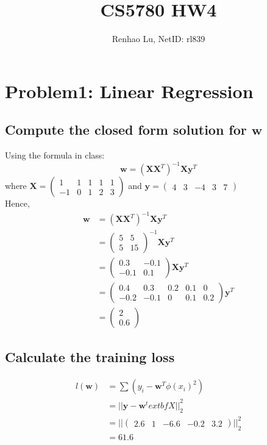 \documentclass{article}
\title{CS5780 HW4}
\author{Renhao Lu, NetID: rl839}
\begin{document}
	\maketitle
	
	\section{Problem1: Linear Regression}
	\subsection{Compute the closed form solution for $\textbf{w}$}
	Using the formula in class:
	\[
	\textbf{w} = 
		(\textbf{X} \textbf{X}^T) ^{-1}
		\textbf{X}
			\textbf{y}^T
	\]
	where $\textbf{X}=\begin{pmatrix} 1 & 1 & 1 & 1 & 1 \\ -1 & 0 & 1 & 2 & 3\end{pmatrix}$ and  $\textbf{y}=\begin{pmatrix} 4 & 3 & -4& 3 & 7 \end{pmatrix}$\\
	Hence,
	\[\begin{split}
		\textbf{w}&=(\textbf{X}\textbf{X}^T)^{-1}\textbf{X}\textbf{y}^T\\
		&=\begin{pmatrix} 5 & 5 \\ 5 & 15\end{pmatrix}^{-1}\textbf{X}\textbf{y}^T\\
		&=\begin{pmatrix} 0.3 & -0.1 \\ -0.1 & 0.1\end{pmatrix}\textbf{X}\textbf{y}^T\\
		&=\begin{pmatrix} 0.4 & 0.3 & 0.2 & 0.1 & 0 \\ -0.2 & -0.1 & 0 & 0.1 & 0.2\end{pmatrix}\textbf{y}^T\\
		&=\begin{pmatrix} 2 \\ 0.6\end{pmatrix}
	\end{split}\]
	
	\subsection{Calculate the training loss}
	\[
		\begin{split}
			l(\textbf{w})&=\sum (y_i-\textbf{w}^T\phi(x_i)^2)\\
			&={||\textbf{y}-\textbf{w}^textbf{X}||}_2^2\\
			&={||\begin{pmatrix} 2.6 & 1 & -6.6 & -0.2 & 3.2 \end{pmatrix}||}_2^2\\
			&=61.6
		\end{split}
	\]
	
\end{document}
